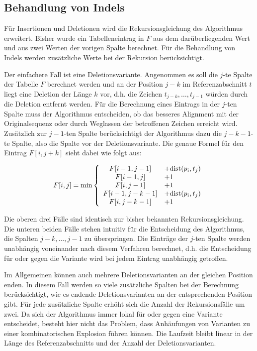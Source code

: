 \subsection{Behandlung von Indels}
\label{sec:align:variants:indel}

Für Insertionen und Deletionen wird die Rekursionsgleichung des Algorithmus erweitert. Bisher wurde ein Tabelleneintrag in $F$ aus dem darüberliegenden Wert und aus zwei Werten der vorigen Spalte berechnet. Für die Behandlung von Indels werden zusätzliche Werte bei der Rekursion berücksichtigt.

Der einfachere Fall ist eine Deletionsvariante. Angenommen es soll die $j$-te Spalte der Tabelle $F$ berechnet werden und an der Position $j-k$ im Referenzabschnitt $t$ liegt eine Deletion der Länge $k$ vor, d.h. die Zeichen $t_{j-k}, \ldots , t_{j-1}$ würden durch die Deletion entfernt werden. Für die Berechnung eines Eintrags in der $j$-ten Spalte muss der Algorithmus entscheiden, ob das besseres Alignment mit der Originalsequenz oder durch Weglassen der betroffenen Zeichen erreicht wird. Zusätzlich zur $j-1$-ten Spalte berücksichtigt der Algorithmus dazu die $j-k-1$-te Spalte, also die Spalte vor der Deletionsvariante. Die genaue Formel für den Eintrag $F[i,j+k]$ sieht dabei wie folgt aus:

\[
F[i,j] = \min \left\{\begin{array}{cl} F[i-1,j-1] &+ \text{dist}(p_i,t_j)\\ F[i-1,j] &+ 1 \\ F[i,j-1] &+ 1 \\ F[i-1,j-k-1] &+ \text{dist}(p_i,t_j) \\ F[i,j-k-1] &+ 1 \end{array}\right. 
\]

Die oberen drei Fälle sind identisch zur bisher bekannten Rekursionsgleichung. Die unteren beiden Fälle stehen intuitiv für die Entscheidung des Algorithmus, die Spalten $j-k, \ldots, j-1$ zu \glqq überspringen\grqq. Die Einträge der $j$-ten Spalte werden unabhängig voneinander nach diesem Verfahren berechnet, d.h. die Entscheidung für oder gegen die Variante wird bei jedem Eintrag unabhängig getroffen.

Im Allgemeinen können auch mehrere Deletionsvarianten an der gleichen Position enden. In diesem Fall werden so viele zusätzliche Spalten bei der Berechnung berücksichtigt, wie es endende Deletionsvarianten an der entsprechenden Position gibt. Für jede zusätzliche Spalte erhöht sich die Anzahl der Rekursionsfälle um zwei. Da sich der Algorithmus immer lokal für oder gegen eine Variante entscheidet, besteht hier nicht das Problem, dass Anhäufungen von Varianten zu einer kombinatorischen Explosion führen können. Die Laufzeit bleibt linear in der Länge des Referenzabschnitts und der Anzahl der Deletionsvarianten.

